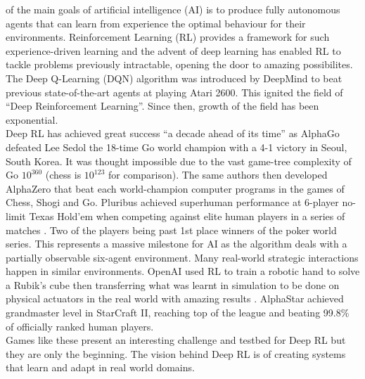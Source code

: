\documentclass[10pt,journal,compsoc]{IEEEtran}
\begin{document}
% 
% 
% 
% 
 of the main goals of artificial intelligence (AI) is to produce fully autonomous agents that can learn from experience the optimal behaviour for their environments. Reinforcement Learning (RL) provides a framework for such experience-driven learning and the advent of deep learning has enabled RL to tackle problems previously intractable, opening the door to amazing possibilites.   The Deep Q-Learning (DQN) algorithm \cite{Mnih:DQN} was introduced by DeepMind to beat previous state-of-the-art agents at playing Atari 2600. This ignited the field of “Deep Reinforcement Learning”. Since then, growth of the field has been exponential.
\\
Deep RL has achieved great success ``a decade ahead of its time'' \cite{WEBSITE:DeepMind} as AlphaGo \cite{silver2016mastering} defeated Lee Sedol the 18-time Go world champion with a 4-1 victory in Seoul, South Korea. It was thought impossible due to the vast game-tree complexity of Go \begin{math}10^{360}\end{math} (chess is \begin{math}10^{123}\end{math} for comparison). 
The same authors then developed AlphaZero \cite{Silver:AlphaZero} that beat each world-champion computer programs in the games of Chess, Shogi and Go.
Pluribus achieved superhuman performance at 6-player no-limit Texas Hold’em when competing against elite human players in a series of matches \cite{brown2019superhuman}. Two of the players being past 1st place winners of the poker world series. This represents a massive milestone for AI as the algorithm deals with a partially observable six-agent environment. Many real-world strategic interactions happen in similar environments.
OpenAI used RL to train a robotic hand to solve a Rubik’s cube then transferring what was learnt in simulation to be done on physical actuators in the real world with amazing results \cite{akkaya2019solving}. 
AlphaStar \cite{vinyals2019grandmaster} achieved grandmaster level in StarCraft II, reaching top of the league and beating 99.8\% of officially ranked human players.
\\
Games like these present an interesting challenge and testbed for Deep RL but they are only the beginning. The vision behind Deep RL is of creating systems that learn and adapt in real world domains.
\end{document}
